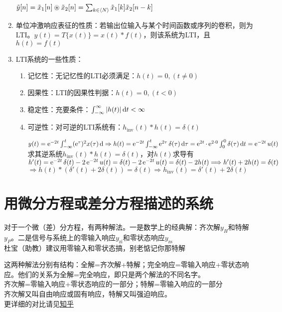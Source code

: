 \documentclass{article}
\newcommand\zi{\mathrm{zi}}
\newcommand\zs{\mathrm{zs}}
\newcommand\inv{\mathrm{inv}}
\begin{document}
\begin{enumerate}[label=(\arabic*)]
				$\tilde{y}[n]=\tilde{x}_1[n]\circledast\tilde{x}_2[n]=\sum_{k\in\langle N\rangle}\tilde{x}_1[k]\tilde{x}_2[n-k]$
	\item 单位冲激响应表征的性质：若输出位输入与某个时间函数或序列的卷积，则为LTI。$y(t)=T\{x(t)\}=x(t)*f(t)$，则该系统为LTI，且$h(t)=f(t)$
	\item LTI系统的一些性质：
				\begin{enumerate}[label=(\roman*)]
					\item 记忆性：无记忆性的LTI必须满足：$h(t)=0,(t\neq 0)$
					\item 因果性：LTI的因果性判据：$h(t)=0,(t<0)$
					\item 稳定性：充要条件：$\int_{-\infty}^{\infty}|h(t)|\mathop{}\!\mathrm{d} t<\infty$
					\item 可逆性：对可逆的LTI系统有：$h_{\inv}(t)*h(t) = \delta(t)$
								\begin{example}
									$y(t) = \operatorname{e}^{-2t}\int_{-\infty}^{t}(\operatorname{e}^{\tau})^2x(\tau)\mathop{}\!\mathrm{d} \Rightarrow h(t)=\operatorname{e}^{-2t}\int_{-\infty}^{t}\operatorname{e}^{2\tau}\delta(\tau)\mathop{}\!\mathrm{d}\tau = \operatorname{e}^{2t}\cdot\operatorname{e}^{2\cdot 0}\int_{0}^{0}\delta(\tau)\mathop{}\!\mathrm{d} t = \operatorname{e}^{-2t}u(t)$\\
									求其逆系统$h_{\inv}(t)*h(t) = \delta(t)$，对$h(t)$求导有$h'(t) = \operatorname{e}^{-2t}\delta(t) -2\operatorname{e}^{-2t}u(t) = \delta(t)-2\operatorname{e}^{-2t}u(t) = \delta(t)-2h(t)\Longrightarrow h'(t)+2h(t) = \delta(t)$\\
									$\Longrightarrow h(t)*(\delta'(t)+2\delta(t)) = \delta(t)\Longrightarrow h_{\inv}(t) = \delta'(t)+2\delta(t)$
								\end{example}
				\end{enumerate}
\end{enumerate}

\section{用微分方程或差分方程描述的系统}
对于一个微（差）分方程，有两种解法。一是数学上的经典解：齐次解$y_{H}$和特解$y_{P}$。二是信号与系统上的零输入响应$y_{\zi}$和零状态响应$y_{\zs}$\\
{\red 杜宝（助教）建议}用零输入和零状态搞，别老惦记你那特解
\begin{remark}
	这两种解法分别有结构：全解=齐次解+特解；完全响应=零输入响应+零状态响应。他们的关系为全解=完全响应，即只是两个解法的不同名字。\\
	齐次解=零输入响应+零状态响应的一部分；特解=零输入响应的一部分\\
	齐次解又叫自由响应或固有响应，特解又叫强迫响应。\\
	更详细的对比请见\href{https://zhuanlan.zhihu.com/p/415103392}{知乎}
\end{remark}
\end{document}

